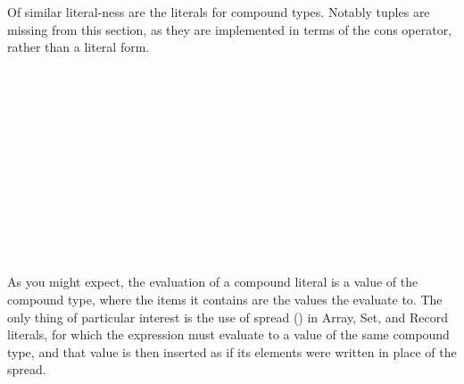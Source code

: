 Of similar literal-ness are the literals for compound types. Notably
tuples are missing from this section, as they are implemented in terms
of the cons operator, rather than a literal form.

\begin{bnf*}
     \\
     \\
     \\
     \\
     \\
     \\
     \\
     \\
     \\
     \\
     \\
\end{bnf*}

As you might expect, the evaluation of a compound literal is a value of the
compound type, where the items it contains are the values the evaluate to.
The only thing of particular interest is the use of spread () in
Array, Set, and Record literals, for which the expression must evaluate
to a value of the same compound type, and that value is then inserted
as if its elements were written in place of the spread.

